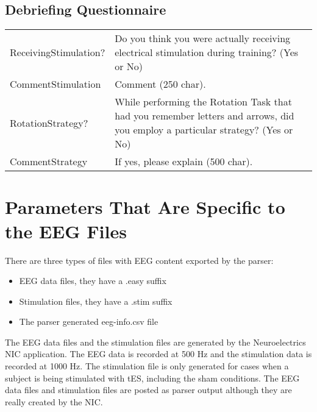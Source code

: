 \documentclass[letterpaper,10pt,english]{sphinxmanual}
\begin{document}
\subsection{Debriefing Questionnaire}
\label{\detokenize{Data_Definations_Phase1B:debriefing-questionnaire}}

\begin{savenotes}\sphinxattablestart
\centering
\begin{tabulary}{\linewidth}[t]{|T|T|}
\hline
{}\relax &\relax \\
\hline
ReceivingStimulation?
&
Do you think you were actually receiving electrical stimulation during training? (Yes or No)
\\
\hline
CommentStimulation
&
Comment (250 char).
\\
\hline
RotationStrategy?
&
While performing the Rotation Task that had you remember letters and arrows, did you employ a particular strategy? (Yes or No)
\\
\hline
CommentStrategy
&
If yes, please explain (500 char).
\\
\hline
\end{tabulary}
\par
\sphinxattableend\end{savenotes}


\section{Parameters That Are Specific to the EEG Files}
\label{\detokenize{Data_Definations_Phase1B:parameters-that-are-specific-to-the-eeg-files}}
There are three types of files with EEG content exported by the parser:
\begin{itemize}
\item {} 
EEG data files, they have a .easy suffix

\item {} 
Stimulation files, they have a .stim suffix

\item {} 
The parser generated eeg-info.csv file

\end{itemize}

The EEG data files and the stimulation files are generated by the
Neuroelectrics NIC application. The EEG data is recorded at 500 Hz and
the stimulation data is recorded at 1000 Hz. The stimulation file is
only generated for cases when a subject is being stimulated with tES,
including the sham conditions. The EEG data files and stimulation files
are posted as parser output although they are really created by the NIC.
\end{document}
